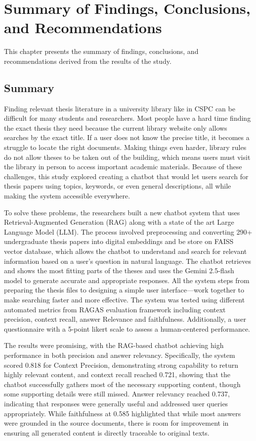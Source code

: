 \chapter{Summary of Findings, Conclusions, and Recommendations}
\begin{refsection}

This chapter presents the summary of findings, conclusions, and recommendations derived from the results of the study.

\section*{Summary}

Finding relevant thesis literature in a university library like in CSPC can be difficult for many students and researchers. Most people have a hard time finding the exact thesis they need because the current library website only allows searches by the exact title. If a user does not know the precise title, it becomes a struggle to locate the right documents. Making things even harder, library rules do not allow theses to be taken out of the building, which means users must visit the library in person to access important academic materials. Because of these challenges, this study explored creating a chatbot that would let users search for thesis papers using topics, keywords, or even general descriptions, all while making the system accessible everywhere.

To solve these problems, the researchers built a new chatbot system that uses Retrieval-Augmented Generation (RAG) along with a state of the art Large Language Model (LLM). The process involved preprocessing and converting 290+ undergraduate thesis papers into digital embeddings and be store on FAISS vector database, which allows the chatbot to understand and search for relevant information based on a user's question in natural language. The chatbot retrieves and shows the most fitting parts of the theses and uses the Gemini 2.5-flash model to generate accurate and appropriate responses. All the system steps from preparing the thesis files to designing a simple user interface—work together to make searching faster and more effective. The system was tested using different automated metrics from RAGAS evaluation framework including context precision, context recall, answer Relevance and faithfulness. Additionally, a user questionnaire with a 5-point likert scale to assess a human-centered performance.

The results were promising, with the RAG-based chatbot achieving high performance in both precision and answer relevancy. Specifically, the system scored 0.818 for Context Precision, demonstrating strong capability to return highly relevant content, and context recall reached 0.721, showing that the chatbot successfully gathers most of the necessary supporting content, though some supporting details were still missed. Answer relevancy reached 0.737, indicating that responses were generally useful and addressed user queries appropriately. While faithfulness at 0.585 highlighted that while most answers were grounded in the source documents, there is room for improvement in ensuring all generated content is directly traceable to original texts. 


\end{refsection}
